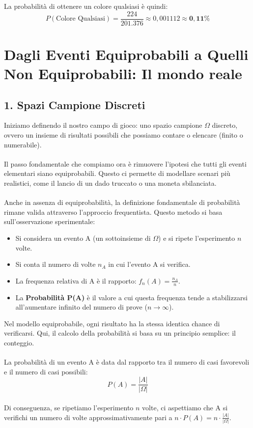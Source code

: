 \begin{esempio}
La probabilità di ottenere un colore qualsiasi è quindi:
\[
P(\text{Colore Qualsiasi}) = \frac{224}{201.376} \approx 0,001112 \approx \mathbf{0,11\%}
\]
\end{esempio}

\newpage


\section*{Dagli Eventi Equiprobabili a Quelli Non Equiprobabili: Il mondo reale}

\subsection*{1. Spazi Campione Discreti}

Iniziamo definendo il nostro campo di gioco: uno spazio campione \(\Omega\) discreto, ovvero un insieme di risultati possibili che possiamo contare o elencare (finito o numerabile).
\\\\
Il passo fondamentale che compiamo ora è rimuovere l'ipotesi che tutti gli eventi elementari siano equiprobabili. Questo ci permette di modellare scenari più realistici, come il lancio di un dado truccato o una moneta sbilanciata.
\\\\
Anche in assenza di equiprobabilità, la definizione fondamentale di probabilità rimane valida attraverso l'approccio frequentista. Questo metodo si basa sull'osservazione sperimentale:
\begin{itemize}
    \item Si considera un evento A (un sottoinsieme di \(\Omega\)) e si ripete l'esperimento \(n\) volte.
    \item Si conta il numero di volte \(n_A\) in cui l'evento A si verifica.
    \item La frequenza relativa di A è il rapporto: \( f_n(A) = \frac{n_A}{n} \).
    \item La \textbf{Probabilità P(A)} è il valore a cui questa frequenza tende a stabilizzarsi all'aumentare infinito del numero di prove (\(n \to \infty\)).
\end{itemize}

Nel modello equiprobabile, ogni risultato ha la stessa identica chance di verificarsi. Qui, il calcolo della probabilità si basa su un principio semplice: il conteggio.
\\\\
La probabilità di un evento A è data dal rapporto tra il numero di casi favorevoli e il numero di casi possibili:
\[ P(A) = \frac{|A|}{|\Omega|} \]
\\
Di conseguenza, se ripetiamo l'esperimento \(n\) volte, ci aspettiamo che A si verifichi un numero di volte approssimativamente pari a \( n \cdot P(A) = n \cdot \frac{|A|}{|\Omega|} \).

